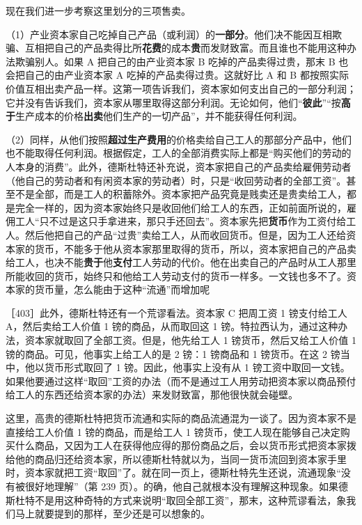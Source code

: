 现在我们进一步考察这里划分的三项售卖。

（1）产业资本家自己吃掉自己产品（或利润）的\textbf{一部分}。他们决不能因互相欺骗、互相把自己的产品卖得比所\textbf{花费}的成本\textbf{贵}而发财致富。而且谁也不能用这种办法欺骗别人。如果 A 把自己的由产业资本家 B 吃掉的产品卖得过贵，那末 B 也会把自己的由产业资本家 A 吃掉的产品卖得过贵。这就好比 A 和 B 都按照实际价值互相出卖产品一样。这第一项告诉我们，资本家如何支出自己的一部分利润；它并没有告诉我们，资本家从哪里取得这部分利润。无论如何，他们“\textbf{彼此}”“按\textbf{高于}生产成本的价格\textbf{出卖}他们生产的一切产品”，并不能获得任何利润。

（2）同样，从他们按照\textbf{超过生产费用}的价格卖给自己工人的那部分产品中，他们也不能取得任何利润。根据假定，工人的全部消费实际上都是“购买他们的劳动的人本身的消费”。此外，德斯杜特还补充说，资本家把自己的产品卖给雇佣劳动者（他自己的劳动者和有闲资本家的劳动者）时，只是“收回劳动者的全部工资”。甚至不是全部，而是工人的积蓄除外。资本家把产品究竟是贱卖还是贵卖给工人，都是完全一样的，因为资本家始终只是收回他们给工人的东西，正如前面所说的，雇佣工人“只不过是这只手拿进来，那只手还回去”。资本家先把\textbf{货币}作为工资付给工人。然后他把自己的产品“过贵”卖给工人，从而收回货币。但是，因为工人还给资本家的货币，不能多于他从资本家那里取得的货币，所以，资本家把自己的产品卖给工人，也决不能\textbf{贵于}他\textbf{支付}工人劳动的代价。他在出卖自己的产品时从工人那里所能收回的货币，始终只和他给工人劳动支付的货币一样多。一文钱也多不了。资本家的货币量，怎么能由于这种“流通”而增加呢

［403］此外，德斯杜特还有一个荒谬看法。资本家 C 把周工资 1 镑支付给工人 A，然后卖给工人价值 1 镑的商品，从而取回这 1 镑。特拉西认为，通过这种办法，资本家就取回了全部工资。但是，他先给工人 1 镑货币，然后又给工人价值 1 镑的商品。可见，他事实上给工人的是 2 镑：1 镑商品和 1 镑货币。在这 2 镑当中，他以货币形式取回了 1 镑。因此，他事实上没有从 1 镑工资中取回一文钱。如果他要通过这样“取回”工资的办法（而不是通过工人用劳动把资本家以商品预付给工人的东西还给资本家的办法）来发财致富，那他很快就会碰壁。

这里，高贵的德斯杜特把货币流通和实际的商品流通混为一谈了。因为资本家不是直接给工人价值 1 镑的商品，而是给工人 1 镑货币，使工人现在能够自己决定购买什么商品，又因为工人在获得他应得的那份商品之后，会以货币形式把资本家拨给他的商品归还给资本家，所以德斯杜特就以为，当同一货币流回到资本家手里时，资本家就把工资“取回”了。就在同一页上，德斯杜特先生还说，流通现象“没有被很好地理解”（第 239 页）。的确，他自己就根本没有理解这种现象。如果德斯杜特不是用这种奇特的方式来说明“取回全部工资”，那末，这种荒谬看法，象我们马上就要提到的那样，至少还是可以想象的。


